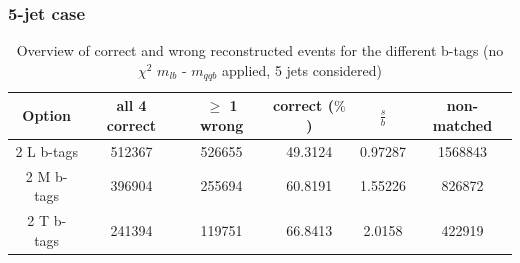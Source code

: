 \newpage
\subsubsection{5-jet case}
\begin{table}[!h] 
 \begin{tabular}{c|c|c|c|c|c} 
  \textbf{Option} & all 4 correct & $\geq$ 1 wrong       & correct ($\%$)       & $\frac{s}{b}$ & non-matched \\ \hline 
  2 L b-tags              & 512367 & 526655 & 49.3124 & 0.97287 & 1568843\\ 
  2 M b-tags              & 396904 & 255694 & 60.8191 & 1.55226 & 826872\\ 
  2 T b-tags              & 241394 & 119751 & 66.8413 & 2.0158 & 422919\\ 
 \end{tabular} 
 \caption{Overview of correct and wrong reconstructed events for the different b-tags (no $\chi^{2}$ $m_{lb}$ - $m_{qqb}$ applied, 5 jets considered)}
\end{table} 
 
